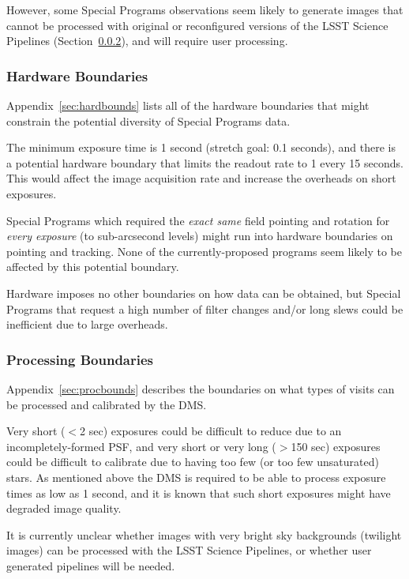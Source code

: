 However, some Special Programs observations seem likely to generate 
images that cannot be processed with original or reconfigured versions of 
the LSST Science Pipelines (Section~\ref{ssec:proc_bounds_processing}), 
and will require user processing.


\subsubsection{Hardware Boundaries}\label{ssec:proc_bounds_hardware}

Appendix~\ref{sec:hardbounds} lists all of the hardware boundaries that 
might constrain the potential diversity of Special Programs data.

The minimum exposure time is 1 second (stretch goal: 0.1 seconds), and 
there is a potential hardware boundary that limits the readout rate to 1 
every 15 seconds.
This would affect the image acquisition rate and increase the overheads 
on short exposures.

Special Programs which required the \emph{exact same} field pointing and 
rotation for \emph{every exposure} (to sub-arcsecond levels) might run 
into hardware boundaries on pointing and tracking.
None of the currently-proposed programs seem likely to be affected by 
this potential boundary. 

Hardware imposes no other boundaries on how data can be obtained, but 
Special Programs that request a high number of filter changes and/or long 
slews could be inefficient due to large overheads.


\subsubsection{Processing Boundaries}\label{ssec:proc_bounds_processing}

Appendix~\ref{sec:procbounds} describes the boundaries on what types of visits 
can be processed and calibrated by the DMS.

Very short ($<$2 sec) exposures could be difficult to reduce due to an 
incompletely-formed PSF, and very short or very long ($>$150 sec) 
exposures could be difficult to calibrate due to having too few (or too 
few unsaturated) stars.
As mentioned above the DMS is required to be able to process exposure 
times as low as 1 second, and it is known that such short exposures might 
have degraded image quality.

It is currently unclear whether images with very bright sky backgrounds 
(twilight images) can be processed with the LSST Science Pipelines, or 
whether user generated pipelines will be needed.

